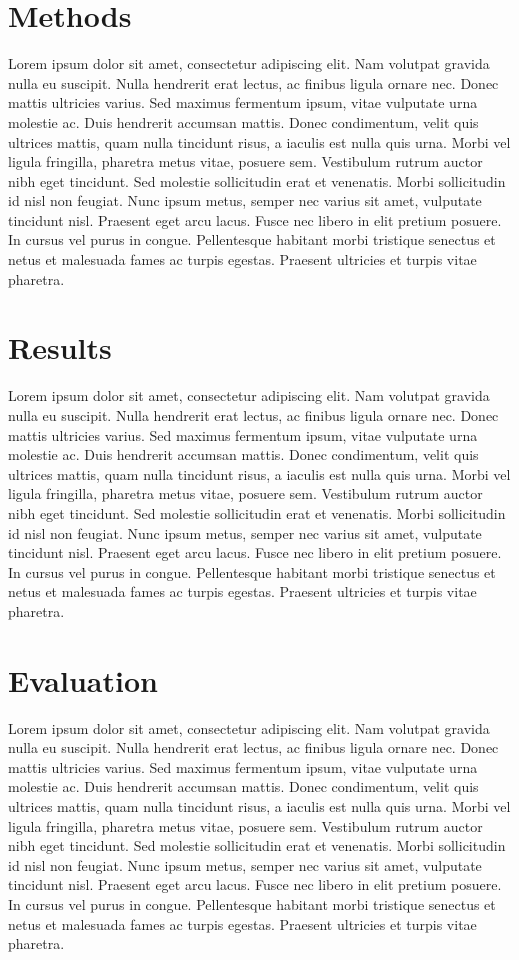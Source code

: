 \section{Methods}
Lorem ipsum dolor sit amet, consectetur adipiscing elit. Nam volutpat gravida nulla eu suscipit. Nulla hendrerit erat lectus, ac finibus ligula ornare nec. Donec mattis ultricies varius. Sed maximus fermentum ipsum, vitae vulputate urna molestie ac. Duis hendrerit accumsan mattis. Donec condimentum, velit quis ultrices mattis, quam nulla tincidunt risus, a iaculis est nulla quis urna. Morbi vel ligula fringilla, pharetra metus vitae, posuere sem. Vestibulum rutrum auctor nibh eget tincidunt. Sed molestie sollicitudin erat et venenatis. Morbi sollicitudin id nisl non feugiat. Nunc ipsum metus, semper nec varius sit amet, vulputate tincidunt nisl. Praesent eget arcu lacus. Fusce nec libero in elit pretium posuere. In cursus vel purus in congue. Pellentesque habitant morbi tristique senectus et netus et malesuada fames ac turpis egestas. Praesent ultricies et turpis vitae pharetra.

\section{Results}
Lorem ipsum dolor sit amet, consectetur adipiscing elit. Nam volutpat gravida nulla eu suscipit. Nulla hendrerit erat lectus, ac finibus ligula ornare nec. Donec mattis ultricies varius. Sed maximus fermentum ipsum, vitae vulputate urna molestie ac. Duis hendrerit accumsan mattis. Donec condimentum, velit quis ultrices mattis, quam nulla tincidunt risus, a iaculis est nulla quis urna. Morbi vel ligula fringilla, pharetra metus vitae, posuere sem. Vestibulum rutrum auctor nibh eget tincidunt. Sed molestie sollicitudin erat et venenatis. Morbi sollicitudin id nisl non feugiat. Nunc ipsum metus, semper nec varius sit amet, vulputate tincidunt nisl. Praesent eget arcu lacus. Fusce nec libero in elit pretium posuere. In cursus vel purus in congue. Pellentesque habitant morbi tristique senectus et netus et malesuada fames ac turpis egestas. Praesent ultricies et turpis vitae pharetra.

\section{Evaluation}
Lorem ipsum dolor sit amet, consectetur adipiscing elit. Nam volutpat gravida nulla eu suscipit. Nulla hendrerit erat lectus, ac finibus ligula ornare nec. Donec mattis ultricies varius. Sed maximus fermentum ipsum, vitae vulputate urna molestie ac. Duis hendrerit accumsan mattis. Donec condimentum, velit quis ultrices mattis, quam nulla tincidunt risus, a iaculis est nulla quis urna. Morbi vel ligula fringilla, pharetra metus vitae, posuere sem. Vestibulum rutrum auctor nibh eget tincidunt. Sed molestie sollicitudin erat et venenatis. Morbi sollicitudin id nisl non feugiat. Nunc ipsum metus, semper nec varius sit amet, vulputate tincidunt nisl. Praesent eget arcu lacus. Fusce nec libero in elit pretium posuere. In cursus vel purus in congue. Pellentesque habitant morbi tristique senectus et netus et malesuada fames ac turpis egestas. Praesent ultricies et turpis vitae pharetra.